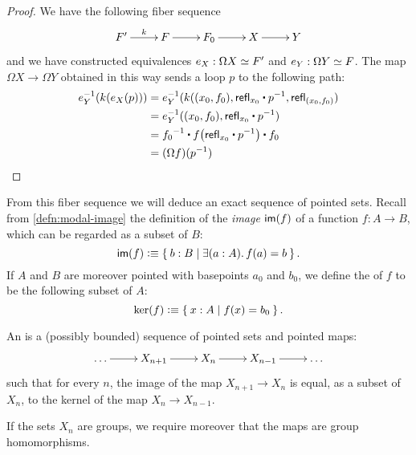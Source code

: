 \begin{proof}
  We have the following fiber sequence
  \[\xymatrix{F' \ar^-k[r] & F \ar[r] & F_0 \ar[r] & X \ar[r] & Y}\]
  and we have constructed equivalences $e_X:\Omega X \simeq F'$ and
  $e_Y:\Omega Y \simeq F$. The map $\Omega X\to\Omega Y$ obtained in this way
  sends a loop $p$ to the following path:
  \begin{align*}
    e_Y^{-1}(k(e_X(p))) &=
    e_Y^{-1}(k((x_0,f_0),\refl{x_0}\ct\rev{p},\refl{(x_0,f_0)}) \\
    &= e_Y^{-1}((x_0,f_0),\refl{x_0}\ct\rev{p}) \\
    &= \rev{f_0}\ct\ap{f}{\refl{x_0}\ct\rev{p}}\ct f_0 \\
    &= (\Omega f)(\rev{p}) \qedhere
  \end{align*}
\end{proof}

From this fiber sequence we will deduce an exact sequence of pointed sets.
%
Recall from \autoref{defn:modal-image} the definition of the \emph{image} $\mathsf{im}(f)$ of a function $f:A\to B$, which can be regarded as a subset of $B$:
\[\im(f) \defeq \setof{b:B | \exis{a:A} f(a)=b}. \]
If $A$ and $B$ are moreover pointed with basepoints $a_0$ and $b_0$, we define the 
%
%
of $f$ to be the following subset of $A$:
\[\ker(f) \vcentcolon\equiv \Set{x:A | f(x) = b_0}. \]

\begin{defn}
  An 
  is a (possibly bounded) sequence of pointed sets
  and pointed maps:
  \[\xymatrix{\dots \ar[r] & X_{n+1} \ar[r] & X_n \ar[r] & X_{n-1} \ar[r] &
    \dots}\]
  such that for every $n$, the image of the map $X_{n+1} \to X_n$ is equal, as a subset of $X_n$, to the kernel of the map $X_n \to X_{n-1}$.

  If the sets $X_n$ are groups, we require moreover that the maps are group homomorphisms.
\end{defn}

